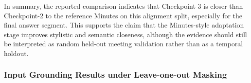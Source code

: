 In summary, the reported comparison indicates that Checkpoint-3 is closer than Checkpoint-2 to the reference Minutes on this alignment split, especially for the final answer segment. This supports the claim that the Minutes-style adaptation stage improves stylistic and semantic closeness, although the evidence should still be interpreted as random held-out meeting validation rather than as a temporal holdout.




\subsubsection*{Input Grounding Results under Leave-one-out Masking}

